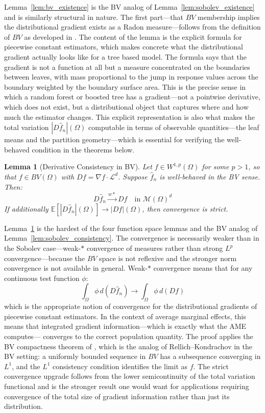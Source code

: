 \documentclass[12pt]{article}
\newtheorem{lemma}{Lemma}
\newcommand{\E}{\mathbb{E}}
\newcommand{\Wonep}{W^{1,p}(\Omega)}
\newcommand{\BV}{BV(\Omega)}
\newcommand{\cM}{\mathcal{M}(\Omega)^d}
\newcommand{\fn}{\hat{f}_n}
\newcommand{\wstar}{\xrightarrow{w*}}
\begin{document}
	Lemma~\ref{lem:bv_existence} is the BV analog of Lemma~\ref{lem:sobolev_existence}
	and is similarly structural in nature. The first part---that $BV$ membership implies
	the distributional gradient exists as a Radon measure---follows from the definition
	of $BV$ as developed in \citet[Chapter~3]{ambrosio2000bv}. The content of the lemma
	is the explicit formula for piecewise constant estimators, which makes concrete what
	the distributional gradient actually looks like for a tree based model. The formula
	says that the gradient is not a function at all but a measure concentrated on the
	boundaries between leaves, with mass proportional to the jump in response values
	across the boundary weighted by the boundary surface area. This is the precise sense
	in which a random forest or boosted tree has a gradient---not a pointwise derivative,
	which does not exist, but a distributional object that captures where and how much
	the estimator changes. This explicit representation is also what makes the total
	variation $|D\fn|(\Omega)$ computable in terms of observable quantities---the leaf
	means and the partition geometry---which is essential for verifying the well-behaved
	condition in the theorems below.
	
	\begin{lemma}[Derivative Consistency in BV]
		\label{lem:bv_consistency}
		Let $f \in \Wonep$ for some $p > 1$, so that $f \in \BV$ with
		$Df = \nabla f \cdot \mathcal{L}^d$. Suppose $\fn$ is well-behaved in the BV sense.
		Then:
		\begin{equation}
			D\fn \wstar Df \quad \text{in } \cM
		\end{equation}
		If additionally $\E[|D\fn|(\Omega)] \to |Df|(\Omega)$, then convergence is strict.
	\end{lemma}
	
	Lemma~\ref{lem:bv_consistency} is the hardest of the four function space lemmas and
	the BV analog of Lemma~\ref{lem:sobolev_consistency}. The convergence is necessarily
	weaker than in the Sobolev case---weak-$*$ convergence of measures rather than strong
	$L^p$ convergence---because the $BV$ space is not reflexive and the stronger norm
	convergence is not available in general. Weak-$*$ convergence means that for any
	continuous test function $\phi$:
	\begin{equation}
		\int_\Omega \phi \, d(D\fn) \to \int_\Omega \phi \, d(Df)
	\end{equation}
	which is the appropriate notion of convergence for the distributional gradients of
	piecewise constant estimators. In the context of average marginal effects, this means
	that integrated gradient information---which is exactly what the AME computes---
	converges to the correct population quantity. The proof applies the BV compactness
	theorem of \citet[Theorem~3.23]{ambrosio2000bv}, which is the analog of
	Rellich--Kondrachov in the BV setting: a uniformly bounded sequence in $BV$ has a
	subsequence converging in $L^1$, and the $L^1$ consistency condition identifies the
	limit as $f$. The strict convergence upgrade follows from the lower semicontinuity of
	the total variation functional and is the stronger result one would want for
	applications requiring convergence of the total size of gradient information rather
	than just its distribution.
	
\end{document}
